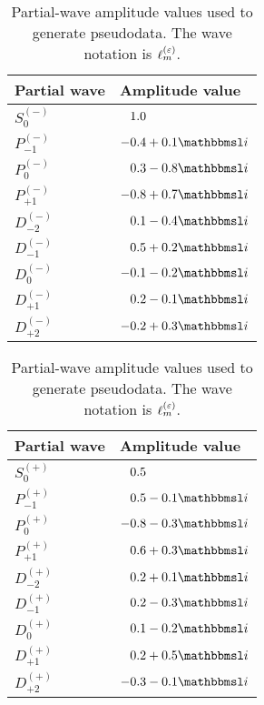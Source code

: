 \begin{table}[tbp]
  \centering%
  \renewcommand{\arraystretch}{1.2}%
  \caption{Partial-wave amplitude values used to generate pseudodata.
  The wave notation is $\ell_m^{(\varepsilon)}$.}%
  \label{tab:photoprod_study_waveset}%
  \vspace*{1ex}%
  \hfill%
  \begin{tabular}{ll}
    \toprule
    \textbf{Partial wave} &
    \textbf{Amplitude value} \\
    \midrule
    $S_0^{(-)}$    & $\hphantom{-}1.0$ \\
    $P_{-1}^{(-)}$ & $-0.4 + 0.1 \imag$ \\
    $P_0^{(-)}$    & $\hphantom{-}0.3 - 0.8 \imag$ \\
    $P_{+1}^{(-)}$ & $-0.8 + 0.7 \imag$ \\
    $D_{-2}^{(-)}$ & $\hphantom{-}0.1 - 0.4 \imag$ \\
    $D_{-1}^{(-)}$ & $\hphantom{-}0.5 + 0.2 \imag$ \\
    $D_0^{(-)}$    & $-0.1 - 0.2 \imag$ \\
    $D_{+1}^{(-)}$ & $\hphantom{-}0.2 - 0.1 \imag$ \\
    $D_{+2}^{(-)}$ & $-0.2 + 0.3 \imag$ \\
    \bottomrule
  \end{tabular}
  \hfill%
  \begin{tabular}{ll}
    \toprule
    \textbf{Partial wave} &
    \textbf{Amplitude value} \\
    \midrule
    $S_0^{(+)}$    & $\hphantom{-}0.5$ \\
    $P_{-1}^{(+)}$ & $\hphantom{-}0.5 - 0.1 \imag$ \\
    $P_0^{(+)}$    & $-0.8 - 0.3 \imag$ \\
    $P_{+1}^{(+)}$ & $\hphantom{-}0.6 + 0.3 \imag$ \\
    $D_{-2}^{(+)}$ & $\hphantom{-}0.2 + 0.1 \imag$ \\
    $D_{-1}^{(+)}$ & $\hphantom{-}0.2 - 0.3 \imag$ \\
    $D_0^{(+)}$    & $\hphantom{-}0.1 - 0.2 \imag$ \\
    $D_{+1}^{(+)}$ & $\hphantom{-}0.2 + 0.5 \imag$ \\
    $D_{+2}^{(+)}$ & $-0.3 - 0.1 \imag$ \\
    \bottomrule
  \end{tabular}
  \hfill\null%
\end{table}

